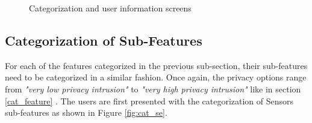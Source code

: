 \begin{figure}[htp]
  \hspace{1em}
  \caption{Categorization and user information screens}
  \label{fig:cat}
\end{figure}

\subsection{Categorization of Sub-Features}
For each of the features categorized in the previous sub-section, their sub-features need to be categorized in a similar fashion. Once again,
the privacy options range from \textit{"very low privacy intrusion"} to \textit{"very high privacy intrusion"} like in section \ref{cat_feature} . The users are first presented with
the categorization of Sensors sub-features as shown in Figure \ref{fig:cat_se}. 

